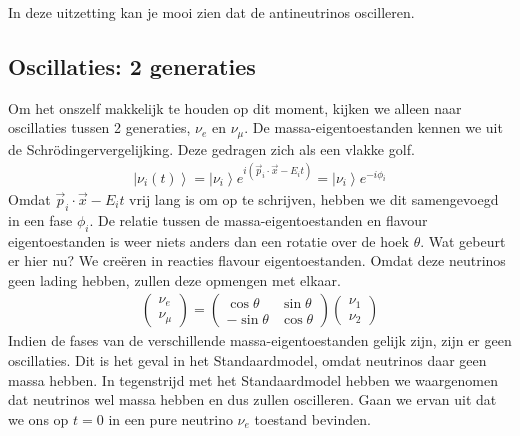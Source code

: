 \documentclass[../main.tex]{subfiles}
\begin{document}
In deze uitzetting kan je mooi zien dat de antineutrinos oscilleren.

\subsection{Oscillaties: 2 generaties}%
\label{sub:oscillaties_2_generaties}

Om het onszelf makkelijk te houden op dit moment, kijken we alleen naar oscillaties tussen 2 generaties, $\nu_e$ en $\nu_\mu$. De massa-eigentoestanden kennen we uit de Schrödingervergelijking. Deze gedragen zich als een vlakke golf.
\begin{equation}
    \begin{aligned}
        \label{eq:massa_eigentoestanden_neutrinos}
        \left|\nu_{i}(t)\right>=\left| \nu_{i}\right>e^{i\left(\vec{p}_{i} \cdot \vec{x}-E_{i} t\right)}=\left| \nu_{i}\right>e^{-i \phi_{i}}
    \end{aligned}
\end{equation}
Omdat $\vec{p}_{i} \cdot \vec{x}-E_{i} t$ vrij lang is om op te schrijven, hebben we dit samengevoegd in een fase $\phi_i$. De relatie tussen de massa-eigentoestanden en flavour eigentoestanden is weer niets anders dan een rotatie over de hoek $\theta$. Wat gebeurt er hier nu? We creëren in reacties flavour eigentoestanden. Omdat deze neutrinos geen lading hebben, zullen deze opmengen met elkaar.
\begin{equation}
    \begin{aligned}
        \label{eq:neutrino_2_gen_opmenging}
        \left(\begin{array}{c}
                \nu_{e} \\
                \nu_{\mu}
                \end{array}\right)=\left(\begin{array}{cc}
                \cos \theta & \sin \theta \\
                -\sin \theta & \cos \theta
                \end{array}\right)\left(\begin{array}{l}
                \nu_{1} \\
                \nu_{2}
        \end{array}\right)
    \end{aligned}
\end{equation}
Indien de fases van de verschillende massa-eigentoestanden gelijk zijn, zijn er geen oscillaties. Dit is het geval in het Standaardmodel, omdat neutrinos daar geen massa hebben. In tegenstrijd met het Standaardmodel hebben we waargenomen dat neutrinos wel massa hebben en dus zullen oscilleren. Gaan we ervan uit dat we ons op $t=0$ in een pure neutrino $\nu_e$ toestand bevinden.
\end{document}
